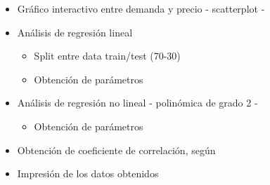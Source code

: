 \documentclass[11pt]{article}
\providecommand{\tightlist}{%
      \setlength{\itemsep}{0pt}\setlength{\parskip}{0pt}}
\begin{document}
    \begin{itemize}
\tightlist
\item
  Gráfico interactivo entre demanda y precio - scatterplot -
\item
  Análisis de regresión lineal

  \begin{itemize}
  \tightlist
  \item
    Split entre data train/test (70-30)
  \item
    Obtención de parámetros
  \end{itemize}
\item
  Análisis de regresión no lineal - polinómica de grado 2 -

  \begin{itemize}
  \tightlist
  \item
    Obtención de parámetros
  \end{itemize}
\item
  Obtención de coeficiente de correlación, según
\item
  Impresión de los datos obtenidos
\end{itemize}
\end{document}
